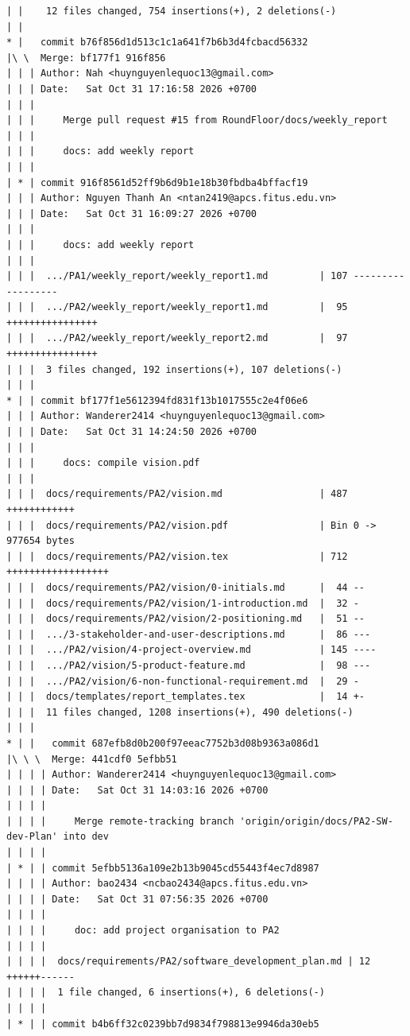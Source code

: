 \documentclass[12pt]{article}
\begin{document}
\begin{lstlisting}[numbers=none,breaklines=true]
| |    12 files changed, 754 insertions(+), 2 deletions(-)
| |
* |   commit b76f856d1d513c1c1a641f7b6b3d4fcbacd56332
|\ \  Merge: bf177f1 916f856
| | | Author: Nah <huynguyenlequoc13@gmail.com>
| | | Date:   Sat Oct 31 17:16:58 2026 +0700
| | |
| | |     Merge pull request #15 from RoundFloor/docs/weekly_report
| | |
| | |     docs: add weekly report
| | |
| * | commit 916f8561d52ff9b6d9b1e18b30fbdba4bffacf19
| | | Author: Nguyen Thanh An <ntan2419@apcs.fitus.edu.vn>
| | | Date:   Sat Oct 31 16:09:27 2026 +0700
| | |
| | |     docs: add weekly report
| | |
| | |  .../PA1/weekly_report/weekly_report1.md         | 107 ------------------
| | |  .../PA2/weekly_report/weekly_report1.md         |  95 ++++++++++++++++
| | |  .../PA2/weekly_report/weekly_report2.md         |  97 ++++++++++++++++
| | |  3 files changed, 192 insertions(+), 107 deletions(-)
| | |
* | | commit bf177f1e5612394fd831f13b1017555c2e4f06e6
| | | Author: Wanderer2414 <huynguyenlequoc13@gmail.com>
| | | Date:   Sat Oct 31 14:24:50 2026 +0700
| | |
| | |     docs: compile vision.pdf
| | |
| | |  docs/requirements/PA2/vision.md                 | 487 ++++++++++++
| | |  docs/requirements/PA2/vision.pdf                | Bin 0 -> 977654 bytes
| | |  docs/requirements/PA2/vision.tex                | 712 ++++++++++++++++++
| | |  docs/requirements/PA2/vision/0-initials.md      |  44 --
| | |  docs/requirements/PA2/vision/1-introduction.md  |  32 -
| | |  docs/requirements/PA2/vision/2-positioning.md   |  51 --
| | |  .../3-stakeholder-and-user-descriptions.md      |  86 ---
| | |  .../PA2/vision/4-project-overview.md            | 145 ----
| | |  .../PA2/vision/5-product-feature.md             |  98 ---
| | |  .../PA2/vision/6-non-functional-requirement.md  |  29 -
| | |  docs/templates/report_templates.tex             |  14 +-
| | |  11 files changed, 1208 insertions(+), 490 deletions(-)
| | |
* | |   commit 687efb8d0b200f97eeac7752b3d08b9363a086d1
|\ \ \  Merge: 441cdf0 5efbb51
| | | | Author: Wanderer2414 <huynguyenlequoc13@gmail.com>
| | | | Date:   Sat Oct 31 14:03:16 2026 +0700
| | | |
| | | |     Merge remote-tracking branch 'origin/origin/docs/PA2-SW-dev-Plan' into dev
| | | |
| * | | commit 5efbb5136a109e2b13b9045cd55443f4ec7d8987
| | | | Author: bao2434 <ncbao2434@apcs.fitus.edu.vn>
| | | | Date:   Sat Oct 31 07:56:35 2026 +0700
| | | |
| | | |     doc: add project organisation to PA2
| | | |
| | | |  docs/requirements/PA2/software_development_plan.md | 12 ++++++------
| | | |  1 file changed, 6 insertions(+), 6 deletions(-)
| | | |
| * | | commit b4b6ff32c0239bb7d9834f798813e9946da30eb5

\end{lstlisting}
\end{document}
